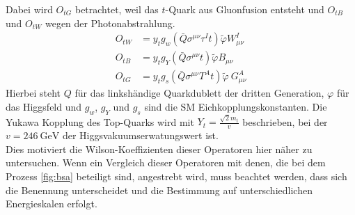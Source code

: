 Dabei wird $O_{tG}$ betrachtet, weil das $t$-Quark aus Gluonfusion entsteht und $O_{tB}$ und $O_{tW}$ wegen der Photonabstrahlung.
\begin{align}
   O_{tW} &= y_t g_w \left(\bar{Q}\sigma^{\mu\nu}\tau^{I} t \right) \tilde{\varphi} W^{I}_{\mu\nu}\\
   O_{tB} &= y_t g_Y \left(\bar{Q}\sigma^{\mu\nu} t \right) \tilde{\varphi} B_{\mu\nu}\\
   O_{tG} &= y_t g_s \left(\bar{Q}\sigma^{\mu\nu}T^A t\right)\tilde{\varphi}~ G^{A}_{\mu\nu}
\end{align}
Hierbei steht $Q$ für das linkshändige Quarkdublett der dritten Generation, $\varphi$ für das Higgsfeld und $g_w$, $g_Y$ und $g_s$ sind die SM Eichkopplungskonstanten. Die Yukawa Kopplung des Top-Quarks wird mit $Y_t = \frac{\sqrt{2}m_t}{v}$ beschrieben, bei der $v = \SI{246}{\giga\electronvolt}$ der Higgsvakuumserwatungswert ist.\\
Dies motiviert die Wilson-Koeffizienten dieser Operatoren hier näher zu untersuchen. Wenn ein Vergleich dieser Operatoren mit denen, die bei dem Prozess \ref{fig:bsa} beteiligt sind, angestrebt wird, muss beachtet werden, dass sich die Benennung unterscheidet und die Bestimmung auf unterschiedlichen Energieskalen erfolgt.

